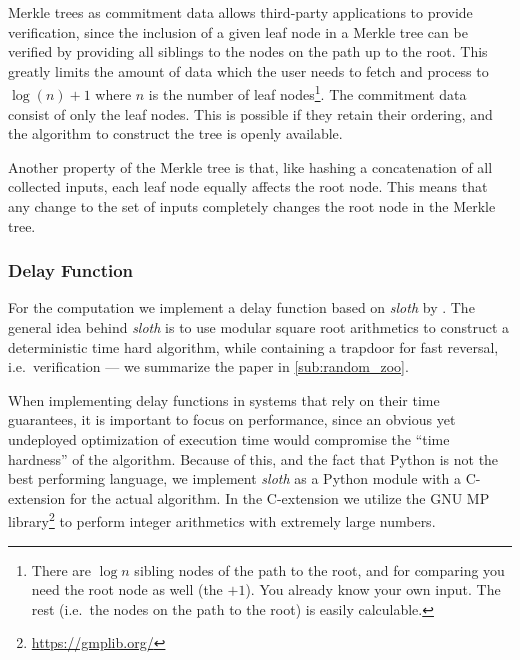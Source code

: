 Merkle trees as commitment data allows third-party applications to provide verification, since the inclusion of a given leaf node in a Merkle tree can be verified by providing all siblings to the nodes on the path up to the root.
This greatly limits the amount of data which the user needs to fetch and process to $\log{(n)}+1$ where $n$ is the number of leaf nodes\footnote{There are $\log{n}$ sibling nodes of the path to the root, and for comparing you need the root node as well (the $+1$). You already know your own input. The rest (i.e.\ the nodes on the path to the root) is easily calculable.}.
The commitment data consist of only the leaf nodes.
This is possible if they retain their ordering, and the algorithm to construct the tree is openly available.

Another property of the Merkle tree is that, like hashing a concatenation of all collected inputs, each leaf node equally affects the root node.
This means that any change to the set of inputs completely changes the root node in the Merkle tree.

\subsubsection{Delay Function}%
\label{ssub:delay_function}
For the computation we implement a delay function based on \textit{sloth} by \citet{randomzoo}.
The general idea behind \textit{sloth} is to use modular square root arithmetics to construct a deterministic time hard algorithm, while containing a trapdoor for fast reversal, i.e.\ verification --- we summarize the paper in \cref{sub:random_zoo}.

When implementing delay functions in systems that rely on their time guarantees, it is important to focus on performance, since an obvious yet undeployed optimization of execution time would compromise the \enquote{time hardness} of the algorithm.
Because of this, and the fact that Python is not the best performing language, we implement \textit{sloth} as a Python module with a C-extension for the actual algorithm.
In the C-extension we utilize the GNU MP library\footnote{\url{https://gmplib.org/}} to perform integer arithmetics with extremely large numbers.
